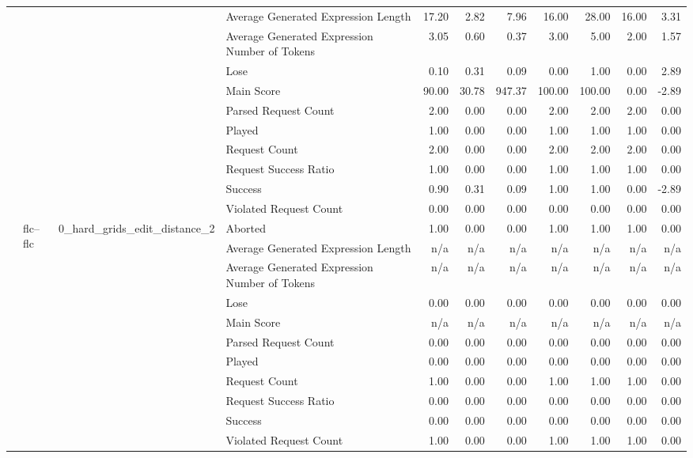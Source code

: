 \begin{tabular}{llllrrrrrrr}
 &  &  & Average Generated Expression Length & 17.20 & 2.82 & 7.96 & 16.00 & 28.00 & 16.00 & 3.31 \\
 &  &  & Average Generated Expression Number of Tokens & 3.05 & 0.60 & 0.37 & 3.00 & 5.00 & 2.00 & 1.57 \\
 &  &  & Lose & 0.10 & 0.31 & 0.09 & 0.00 & 1.00 & 0.00 & 2.89 \\
 &  &  & Main Score & 90.00 & 30.78 & 947.37 & 100.00 & 100.00 & 0.00 & -2.89 \\
 &  &  & Parsed Request Count & 2.00 & 0.00 & 0.00 & 2.00 & 2.00 & 2.00 & 0.00 \\
 &  &  & Played & 1.00 & 0.00 & 0.00 & 1.00 & 1.00 & 1.00 & 0.00 \\
 &  &  & Request Count & 2.00 & 0.00 & 0.00 & 2.00 & 2.00 & 2.00 & 0.00 \\
 &  &  & Request Success Ratio & 1.00 & 0.00 & 0.00 & 1.00 & 1.00 & 1.00 & 0.00 \\
 &  &  & Success & 0.90 & 0.31 & 0.09 & 1.00 & 1.00 & 0.00 & -2.89 \\
 &  &  & Violated Request Count & 0.00 & 0.00 & 0.00 & 0.00 & 0.00 & 0.00 & 0.00 \\
\cline{2-11} \cline{3-11}
 & \multirow[t]{22}{*}{flc--flc} & \multirow[t]{11}{*}{0_hard_grids_edit_distance_2} & Aborted & 1.00 & 0.00 & 0.00 & 1.00 & 1.00 & 1.00 & 0.00 \\
 &  &  & Average Generated Expression Length & n/a & n/a & n/a & n/a & n/a & n/a & n/a \\
 &  &  & Average Generated Expression Number of Tokens & n/a & n/a & n/a & n/a & n/a & n/a & n/a \\
 &  &  & Lose & 0.00 & 0.00 & 0.00 & 0.00 & 0.00 & 0.00 & 0.00 \\
 &  &  & Main Score & n/a & n/a & n/a & n/a & n/a & n/a & n/a \\
 &  &  & Parsed Request Count & 0.00 & 0.00 & 0.00 & 0.00 & 0.00 & 0.00 & 0.00 \\
 &  &  & Played & 0.00 & 0.00 & 0.00 & 0.00 & 0.00 & 0.00 & 0.00 \\
 &  &  & Request Count & 1.00 & 0.00 & 0.00 & 1.00 & 1.00 & 1.00 & 0.00 \\
 &  &  & Request Success Ratio & 0.00 & 0.00 & 0.00 & 0.00 & 0.00 & 0.00 & 0.00 \\
 &  &  & Success & 0.00 & 0.00 & 0.00 & 0.00 & 0.00 & 0.00 & 0.00 \\
 &  &  & Violated Request Count & 1.00 & 0.00 & 0.00 & 1.00 & 1.00 & 1.00 & 0.00 \\

\end{tabular}
